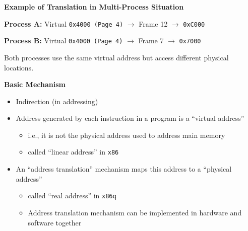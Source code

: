 \documentclass[11pt, table, aspectratio=169]{beamer}
\begin{document}
		\begin{frame}[fragile]{\textbf{Example of Translation in Multi-Process Situation}}

		\textbf{Process A:} Virtual \texttt{0x4000 (Page 4)} $\rightarrow$ Frame 12 $\rightarrow$ \texttt{0xC000}

\textbf{Process B:} Virtual \texttt{0x4000 (Page 4)} $\rightarrow$ Frame 7 $\rightarrow$ \texttt{0x7000}

\begin{center}
\end{center}

Both processes use the same virtual address but access different physical locations.
		\end{frame}
		
\begin{frame}[fragile]{\textbf{Basic Mechanism}}
	\begin{itemize}
		\item Indirection (in addressing) 
		\item Address generated by each instruction in a program is a ``virtual address'' 
		
		\begin{itemize}
			\item  i.e., it is not the physical address used to address main memory
			\item   called ``linear address'' in \texttt{x86}
			
		\end{itemize}
		\item An ``address translation'' mechanism maps this address to a ``physical address''
		\begin{itemize}
			\item called ``real address'' in \texttt{x86q} 
			\item Address translation mechanism can be implemented in hardware and software together 
		\end{itemize}
		 
	\end{itemize}
\end{frame}
		
\end{document}
